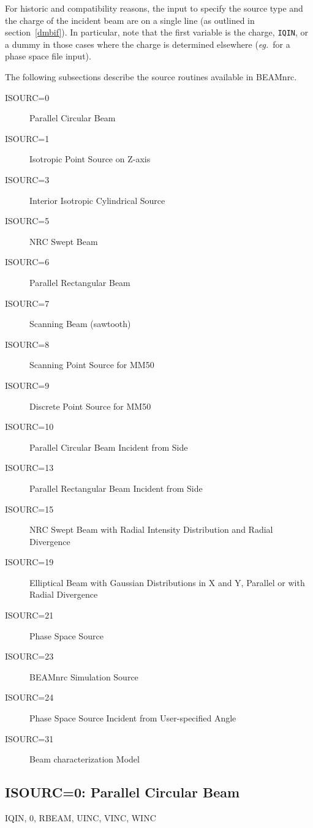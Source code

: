 \documentclass[12pt,twoside]{article}
\newcommand{\cen}[1]{\begin{center} #1 \end{center}                   }
\newcommand{\eg}{{\em eg.}}
\begin{document}
For historic  and compatibility reasons, the input to specify the source type and the
charge of the incident beam are on a single line (as outlined in
section~\ref{dmbif}).  In particular, note that the first variable is
the charge, \verb+IQIN+,
or a dummy in those cases where the charge is determined
elsewhere (\eg\ for a phase space file input).

The following subsections describe the source routines available in BEAMnrc.


\begin{description}

\item [ISOURC=0] Parallel Circular Beam
\item [ISOURC=1] Isotropic Point Source on Z-axis
\item [ISOURC=3] Interior Isotropic Cylindrical Source
\item [ISOURC=5] NRC Swept Beam
\item [ISOURC=6] Parallel Rectangular Beam
\item [ISOURC=7] Scanning Beam (sawtooth)
\item [ISOURC=8] Scanning Point Source for MM50
\item [ISOURC=9] Discrete Point Source for MM50
\item [ISOURC=10] Parallel Circular Beam Incident from Side
\item [ISOURC=13] Parallel Rectangular Beam Incident from Side
\item [ISOURC=15] NRC Swept Beam with Radial Intensity Distribution and
                  Radial Divergence
\item [ISOURC=19] Elliptical Beam with Gaussian Distributions in X and Y,
                  Parallel or with Radial Divergence
\item [ISOURC=21] Phase Space Source
\item [ISOURC=23] BEAMnrc Simulation Source
\item [ISOURC=24] Phase Space Source Incident from User-specified Angle
\item [ISOURC=31] Beam characterization Model

\end{description}
\clearpage
\subsection{ISOURC=0: Parallel Circular Beam}
\cen{IQIN, 0, RBEAM, UINC, VINC, WINC}
  
\end{document}
